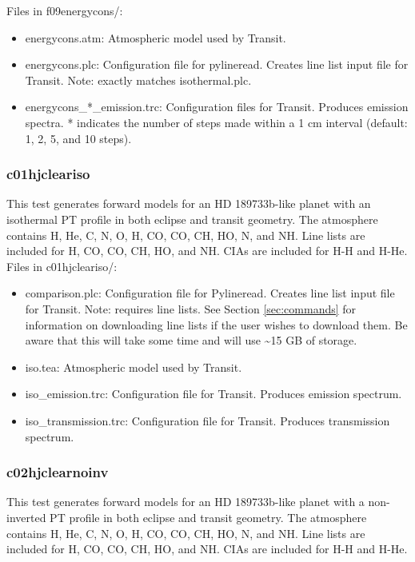 \documentclass[letterpaper, 12pt]{article}
\begin{document}
Files in f09energycons/:
\begin{itemize} \itemsep0pt
  \item energycons.atm: Atmospheric model used by Transit.
  \item energycons.plc: Configuration file for pylineread. Creates 
        line list input file for Transit. Note: exactly matches isothermal.plc.
  \item energycons{\_}*{\_}emission.trc: Configuration files for Transit. Produces 
        emission spectra. * indicates the number of steps made within a 1 cm interval (default: 1, 2, 5, and 10 steps).
\end{itemize}

\subsubsection{c01hjcleariso}
\label{sec:comp-iso}
This test generates forward models for an HD 189733b-like planet with an isothermal PT profile in both eclipse and transit geometry. The atmosphere contains H, He, C, N, O, H, 
CO, CO, CH, HO, N, and NH. Line lists are 
included for H, CO, CO, CH, HO, and NH. CIAs 
are included for H-H and H-He.\\

Files in c01hjcleariso/:
\begin{itemize} \itemsep0pt
  \item comparison.plc: Configuration file for Pylineread. Creates 
        line list input file for Transit. Note: requires line lists. See 
        Section \ref{sec:commands} for information on downloading line lists if 
        the user wishes to download them. Be aware that this will take some 
        time and will use {\sim}15 GB of storage.
  \item iso.tea: Atmospheric model used by Transit.
  \item iso{\_}emission.trc: Configuration file for Transit. Produces 
        emission spectrum.
  \item iso{\_}transmission.trc: Configuration file for Transit. Produces 
        transmission spectrum.
\end{itemize}

\subsubsection{c02hjclearnoinv}
\label{sec:comp-noinv}
This test generates forward models for an HD 189733b-like planet with a non-inverted PT profile in both eclipse and transit geometry. The atmosphere contains H, He, C, N, O, H, 
CO, CO, CH, HO, N, and NH. Line lists are 
included for H, CO, CO, CH, HO, and NH. CIAs 
are included for H-H and H-He.\\
\end{document}
